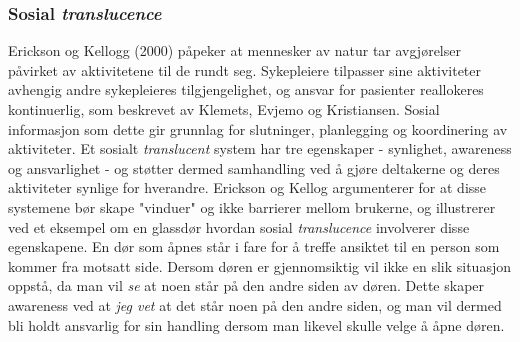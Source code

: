 \subsubsection{Sosial \emph{translucence}}
Erickson og Kellogg (2000) påpeker at mennesker av natur tar avgjørelser påvirket av aktivitetene til de rundt seg. Sykepleiere tilpasser sine aktiviteter avhengig andre sykepleieres tilgjengelighet, og ansvar for pasienter reallokeres kontinuerlig, som beskrevet av Klemets, Evjemo og Kristiansen. Sosial informasjon som dette gir grunnlag for slutninger, planlegging og koordinering av aktiviteter. 
Et sosialt \emph{translucent} system har tre egenskaper - synlighet, awareness og ansvarlighet - og støtter dermed samhandling ved å gjøre deltakerne og deres aktiviteter synlige for hverandre. Erickson og Kellog argumenterer for at disse systemene bør skape "vinduer" og ikke barrierer mellom brukerne, og illustrerer ved et eksempel om en glassdør hvordan sosial \emph{translucence} involverer disse egenskapene. 
En dør som åpnes står i fare for å treffe ansiktet til en person som kommer fra motsatt side. Dersom døren er gjennomsiktig vil ikke en slik situasjon oppstå, da man vil \emph{se} at noen står på den andre siden av døren. Dette skaper awareness ved at \emph{jeg vet} at det står noen på den andre siden, og man vil dermed bli holdt ansvarlig for sin handling dersom man likevel skulle velge å åpne døren.